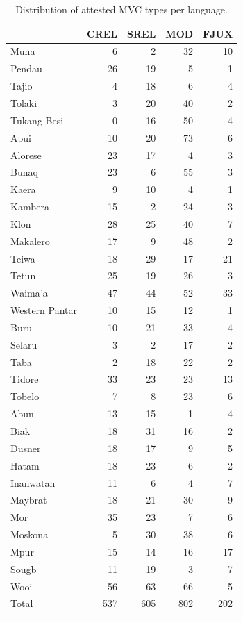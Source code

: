 \begin{table}
\begin{footnotesize}
\begin{tabular}{lrrrr}
  \lsptoprule
 & CREL & SREL & MOD & FJUX \\ 
  \midrule
  Muna &   6 &   2 &  32  &   10  \\ 
  Pendau &  26 &  19 &   5  &   1  \\ 
  Tajio &   4 &  18 &   6  &   4  \\ 
  Tolaki &   3 &  20 &  40  &   2  \\ 
  Tukang Besi &   0 &  16 &  50   &   4 \\ \midrule 
  Abui &  10 &  20 &  73  &   6  \\ 
  Alorese &  23 &  17 &   4  &   3  \\ 
  Bunaq &  23 &   6 &  55  &   3  \\ 
  Kaera &  9 &   10 &  4  &   1  \\ 
  Kambera &  15 &   2 &  24  &   3  \\ 
  Klon &  28 &  25 &  40  &   7  \\ 
  Makalero &  17 &   9 &  48  &   2  \\ 
  Teiwa &   18 &  29 &  17  &   21  \\ 
  Tetun &  25 &  19 &  26  &   3  \\ 
  Waima'a &  47 &  44 &  52  &  33  \\ 
  Western Pantar &  10 &  15 &  12  &   1  \\ \midrule
  Buru & 10 & 21 & 33 & 4 \\
  Selaru &   3 &   2 &   17  &   2  \\ 
  Taba &   2 &  18 &  22  &   2  \\ 
  Tidore & 33 & 23 & 23 & 13 \\
  Tobelo &   7 &   8 &  23  &   6  \\ \midrule
  Abun &  13 &  15 &   1  &   4  \\ 
  Biak &  18 &  31 &  16  &   2  \\ 
  Dusner &  18 &  17 &   9  &  5 \\ 
  Hatam &  18 &  23 &   6  &   2  \\ 
  Inanwatan &  11 &   6 &   4  &   7  \\ 
  Maybrat &  18 &  21 &  30  &   9  \\ 
  Mor &  35 &  23 &   7  &   6  \\ 
  Moskona &   5 &  30 &  38  &   6  \\ 
  Mpur &  15 &  14 &  16  &  17  \\ 
  Sougb &   11 &  19 &   3  &   7 \\ 
  Wooi &  56 &  63 &  66  &   5  \\ 
   \midrule
   Total & 537 & 605 & 802 & 202 \\
   \lspbottomrule
\end{tabular}
\end{footnotesize}
\caption[Distribution of attested MVC types per language]{Distribution of attested MVC types per language.}
\label{table:MVCperlang}
\end{table}

